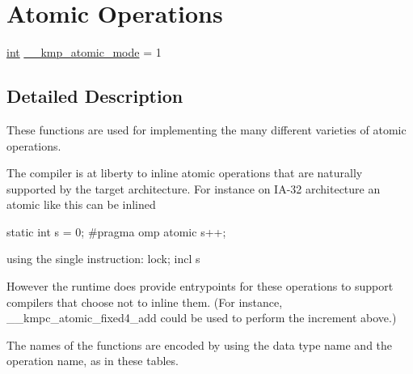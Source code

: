 \hypertarget{group__ATOMIC__OPS}{\section{Atomic Operations}
\label{group__ATOMIC__OPS}
}
\begin{DoxyCompactItemize}
\item 
\hyperlink{ittnotify__static_8h_a8b8dcd723308a8cb5d84277c7a3fff70}{int} \hyperlink{group__ATOMIC__OPS_ga934bb88de29998410569745b7fd2c2e6}{\-\_\-\-\_\-kmp\-\_\-atomic\-\_\-mode} = 1
\end{DoxyCompactItemize}


\subsection{Detailed Description}
These functions are used for implementing the many different varieties of atomic operations.

The compiler is at liberty to inline atomic operations that are naturally supported by the target architecture. For instance on I\-A-\/32 architecture an atomic like this can be inlined 
\begin{DoxyCode}
\textcolor{keyword}{static} \textcolor{keywordtype}{int} s = 0;
\textcolor{preprocessor}{#pragma omp atomic}
\textcolor{preprocessor}{    s++;}
\end{DoxyCode}
 using the single instruction\-: {\ttfamily lock; incl s}

However the runtime does provide entrypoints for these operations to support compilers that choose not to inline them. (For instance, {\ttfamily \-\_\-\-\_\-kmpc\-\_\-atomic\-\_\-fixed4\-\_\-add} could be used to perform the increment above.)

The names of the functions are encoded by using the data type name and the operation name, as in these tables.

